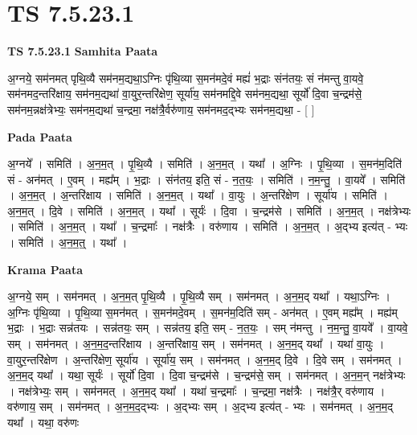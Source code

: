 \documentclass[17pt]{extarticle}
\begin{document}
\section{ TS 7.5.23.1 }

\textbf{TS 7.5.23.1 } \newline
\textbf{Samhita Paata} \newline

अ॒ग्नये॒ सम॑नमत् पृथि॒व्यै सम॑नम॒द्यथा॒ऽग्निः पृ॑थि॒व्या स॒मन॑मदे॒वं मह्यं॑ भ॒द्राः संन॑तयः॒ सं न॑मन्तु वा॒यवे॒ सम॑नमद॒न्तरि॑क्षाय॒ सम॑नम॒द्यथा॑ वा॒युर॒न्तरि॑क्षेण॒ सूर्या॑य॒ सम॑नमद्दि॒वे सम॑नम॒द्यथा॒ सूर्यो॑ दि॒वा च॒न्द्रम॑से॒ सम॑नम॒न्नक्ष॑त्रेभ्यः॒ सम॑नम॒द्यथा॑ च॒न्द्रमा॒ नक्ष॑त्रै॒र्वरु॑णाय॒ सम॑नमद॒द्भ्यः सम॑नम॒द्यथा॒ - [  ] \newline

\textbf{Pada Paata} \newline

अ॒ग्नये᳚ । समिति॑ । अ॒न॒म॒त् । पृ॒थि॒व्यै । समिति॑ । अ॒न॒म॒त् । यथा᳚ । अ॒ग्निः । पृ॒थि॒व्या । स॒मन॑म॒दिति॑ सं - अन॑मत् । ए॒वम् । मह्य᳚म् । भ॒द्राः । संन॑तय॒ इति॒ सं - न॒त॒यः॒ । समिति॑ । न॒म॒न्तु॒ । वा॒यवे᳚ । समिति॑ । अ॒न॒म॒त् । अ॒न्तरि॑क्षाय । समिति॑ । अ॒न॒म॒त् । यथा᳚ । वा॒युः । अ॒न्तरि॑क्षेण । सूर्या॑य । समिति॑ । अ॒न॒म॒त् । दि॒वे । समिति॑ । अ॒न॒म॒त् । यथा᳚ । सूर्यः॑ । दि॒वा । च॒न्द्रम॑से । समिति॑ । अ॒न॒म॒त् । नक्ष॑त्रेभ्यः । समिति॑ । अ॒न॒म॒त् । यथा᳚ । च॒न्द्रमाः᳚ । नक्ष॑त्रैः । वरु॑णाय । समिति॑ । अ॒न॒म॒त् । अ॒द्भ्य इत्य॑त् - भ्यः । समिति॑ । अ॒न॒म॒त्॒ । यथा᳚ ।  \newline


\textbf{Krama Paata} \newline

अ॒ग्नये॒ सम् । सम॑नमत् । अ॒न॒म॒त् पृ॒थि॒व्यै । पृ॒थि॒व्यै सम् । सम॑नमत् । अ॒न॒म॒द् यथा᳚ । यथा॒ऽग्निः । अ॒ग्निः पृ॑थि॒व्या । पृ॒थि॒व्या स॒मन॑मत् । स॒मन॑मदे॒वम् । स॒मन॑म॒दिति॑ सम् - अन॑मत् । ए॒वम् मह्य᳚म् । मह्य॑म् भ॒द्राः । भ॒द्राः सन्न॑तयः । सन्न॑तयः॒ सम् । सन्न॑तय॒ इति॒ सम् - न॒त॒यः॒ । सम् न॑मन्तु । न॒म॒न्तु॒ वा॒यवे᳚ । वा॒यवे॒ सम् । सम॑नमत् । अ॒न॒म॒द॒न्तरि॑क्षाय । अ॒न्तरि॑क्षाय॒ सम् । सम॑नमत् । अ॒न॒म॒द् यथा᳚ । यथा॑ वा॒युः । वा॒युर॒न्तरि॑क्षेण । अ॒न्तरि॑क्षेण॒ सूर्या॑य । सूर्या॑य॒ सम् । सम॑नमत् । अ॒न॒म॒द् दि॒वे । दि॒वे सम् । सम॑नमत् । अ॒न॒म॒द् यथा᳚ । यथा॒ सूर्यः॑ । सूर्यो॑ दि॒वा । दि॒वा च॒न्द्रम॑से । च॒न्द्रम॑से॒ सम् । सम॑नमत् । अ॒न॒म॒न् नक्ष॑त्रेभ्यः । नक्ष॑त्रेभ्यः॒ सम् । सम॑नमत् । अ॒न॒म॒द् यथा᳚ । यथा॑ च॒न्द्रमाः᳚ । च॒न्द्रमा॒ नक्ष॑त्रैः । नक्ष॑त्रै॒र् वरु॑णाय । वरु॑णाय॒ सम् । सम॑नमत् । अ॒न॒म॒द॒द्भ्यः । अ॒द्भ्यः सम् । अ॒द्भ्य इत्य॑त् - भ्यः । सम॑नमत् । अ॒न॒म॒द् यथा᳚ । यथा॒ वरु॑णः \newline
\end{document}
